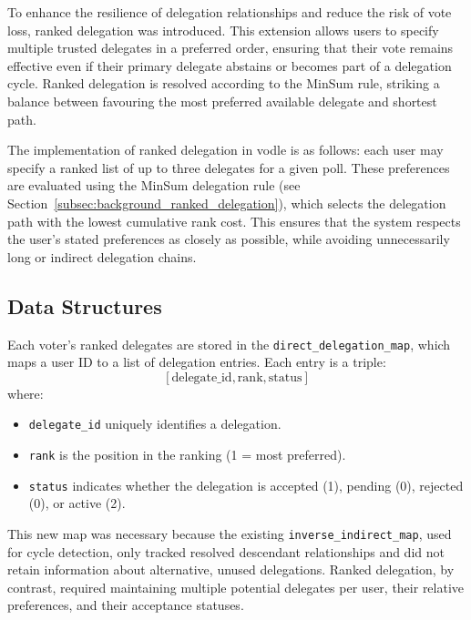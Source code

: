 To enhance the resilience of delegation relationships and reduce the risk of vote loss, ranked delegation was introduced. This extension allows users to specify multiple trusted delegates in a preferred order, ensuring that their vote remains effective even if their primary delegate abstains or becomes part of a delegation cycle. Ranked delegation is resolved according to the MinSum rule, striking a balance between favouring the most preferred available delegate and shortest path.

The implementation of ranked delegation in vodle is as follows: each user may specify a ranked list of up to three delegates for a given poll. These preferences are evaluated using the MinSum delegation rule (see Section~\ref{subsec:background_ranked_delegation}), which selects the delegation path with the lowest cumulative rank cost. This ensures that the system respects the user's stated preferences as closely as possible, while avoiding unnecessarily long or indirect delegation chains.

\subsection{Data Structures}
Each voter's ranked delegates are stored in the \texttt{direct\_delegation\_map}, which maps a user ID to a list of delegation entries. Each entry is a triple:
\[
[\text{delegate\_id}, \text{rank}, \text{status}]
\]
where:
\begin{itemize}
    \item \texttt{delegate\_id} uniquely identifies a delegation.
    \item \texttt{rank} is the position in the ranking (1 = most preferred).
    \item \texttt{status} indicates whether the delegation is accepted (1), pending (0), rejected (0), or active (2).
\end{itemize}

This new map was necessary because the existing \texttt{inverse\_indirect\_map}, used for cycle detection, only tracked resolved descendant relationships and did not retain information about alternative, unused delegations. Ranked delegation, by contrast, required maintaining multiple potential delegates per user, their relative preferences, and their acceptance statuses.


